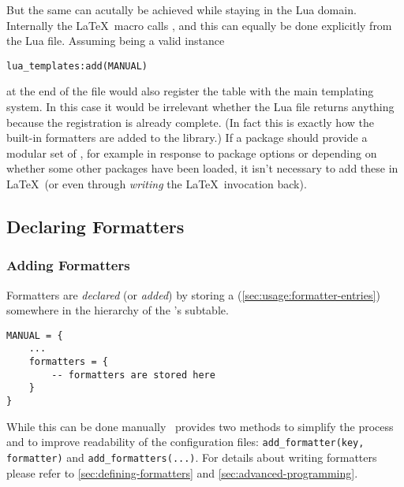 \documentclass[12pt]{scrartcl}
\begin{document}
But the same can acutally be achieved while staying in the Lua domain.
Internally the \LaTeX\ macro calls , and this can
equally be done explicitly from the Lua file.  Assuming  being a
valid  instance

\begin{verbatim}
lua_templates:add(MANUAL)
\end{verbatim}

\noindent at the end of the file would also register the  table
with the main templating system.  In this case it would be irrelevant whether
the Lua file returns anything because the registration is already complete.  (In
fact this is exactly how the built-in formatters are added to the library.) If a
package should provide a modular set of ,
for example in response to package options or depending on whether some other
packages have been loaded, it isn't necessary to add these in \LaTeX\ (or even
through \emph{writing} the \LaTeX\ invocation back).


\subsection{Declaring Formatters}
\label{sec:usage:declaring-formatters}

\subsubsection{Adding Formatters}
\label{sec:usage-adding-formatters}

Formatters are \emph{declared} (or \emph{added}) by storing a  (\vref{sec:usage:formatter-entries}) somewhere in the hierarchy of the
's  subtable.

\begin{verbatim}
MANUAL = {
	...
	formatters = {
		-- formatters are stored here
	}
}
\end{verbatim}

\noindent While this can be done manually \luatemplates\ provides two methods to
simplify the process and to improve readability of the configuration files:
\texttt{add_formatter(key, formatter)} and
\texttt{add_formatters(...)}.  For details about writing formatters
please refer to \vref{sec:defining-formatters} and
\vref{sec:advanced-programming}.


\paragraph{}
\end{document}
